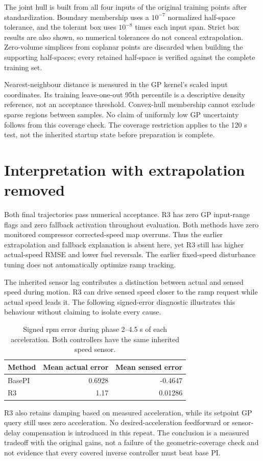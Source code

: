\documentclass[11pt,a4paper]{article}
\begin{document}
The joint hull is built from all four inputs of the original training points after standardization. Boundary membership uses a $10^{-7}$ normalized half-space tolerance, and the tolerant box uses $10^{-8}$ times each input span. Strict box results are also shown, so numerical tolerances do not conceal extrapolation. Zero-volume simplices from coplanar points are discarded when building the supporting half-spaces; every retained half-space is verified against the complete training set.

Nearest-neighbour distance is measured in the GP kernel's scaled input coordinates. Its training leave-one-out 95th percentile is a descriptive density reference, not an acceptance threshold. Convex-hull membership cannot exclude sparse regions between samples. No claim of uniformly low GP uncertainty follows from this coverage check. The coverage restriction applies to the 120 s test, not the inherited startup state before preparation is complete.
\clearpage
\section{Interpretation with extrapolation removed}
Both final trajectories pass numerical acceptance. R3 has zero GP input-range flags and zero fallback activation throughout evaluation. Both methods have zero monitored compressor corrected-speed map overruns. Thus the earlier extrapolation and fallback explanation is absent here, yet R3 still has higher actual-speed RMSE and lower fuel reversals. The earlier fixed-speed disturbance tuning does not automatically optimize ramp tracking.

The inherited sensor lag contributes a distinction between actual and sensed speed during motion. R3 can drive sensed speed closer to the ramp request while actual speed leads it. The following signed-error diagnostic illustrates this behaviour without claiming to isolate every cause.
\begin{table}[H]\centering\small\begin{tabular}{lrr}\toprule
Method & Mean actual error & Mean sensed error\\\midrule
BasePI & 0.6928 & -0.4647\\
R3 & 1.17 & 0.01286\\
\bottomrule\end{tabular}\caption{Signed rpm error during phase 2--4.5 s of each acceleration. Both controllers have the same inherited speed sensor.}\end{table}
R3 also retains damping based on measured acceleration, while its setpoint GP query still uses zero acceleration. No desired-acceleration feedforward or sensor-delay compensation is introduced in this repeat. The conclusion is a measured tradeoff with the original gains, not a failure of the geometric-coverage check and not evidence that every covered inverse controller must beat base PI.
\end{document}
